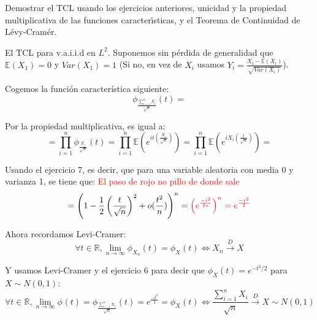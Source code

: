 \begin{problem}[8] Demostrar el TCL usando los ejercicios anteriores, unicidad y la propiedad multiplicativa de las funciones
caracter\'{\i}sticas, y el Teorema de Continuidad de L\'evy-Cram\'er.


\solution
El TCL para v.a.i.i.d en $L^2$. Suponemos sin pérdida de generalidad que $\mathbb{E}(X_1)=0$ y $Var(X_1)=1$ (Si no, en vez de $X_i$ usamos $Y_i =\frac{X_i -\mathbb{E}(X_i)}{\sqrt{Var(X_i)}}$).

Cogemos la función característica siguiente:
\[
\phi_{\frac{\sum_{i=1}^{n}X_i}{\sqrt{n}}}(t) =
\]

Por la propiedad multiplicativa, es igual a:
\[
=\prod_{i=1}^{n} \phi_{\frac{X_i}{\sqrt{n}}}(t)= \prod_{i=1}^{n} \mathbb{E}(e^{it(\frac{X_i}{\sqrt{n}})})=
\prod_{i=1}^{n} \mathbb{E}(e^{iX_i(\frac{t}{\sqrt{n}})})= 
\]

Usando el ejercicio 7, es decir, que para una variable aleatoria con media 0 y varianza 1, se tiene que: \textcolor{red}{El paso de rojo no pillo de donde sale}
\[
=\left(1-\frac{1}{2}\left(\frac{t}{\sqrt{n}}\right)^2+o(\frac{t^2}{n})\right)^n = \textcolor{red}{\left(e^{\frac{-t^2}{2n}}\right)^n=e^{\frac{-t^2}{2}}}
\]

Ahora recordamos Levi-Cramer:
\[
\forall t \in \mathbb{R}, \lim_{n \rightarrow \infty} \phi_{X_n}(t)=\phi_X(t) \Leftrightarrow X_n \stackrel{D}{\rightarrow} X
\]

Y usamos Levi-Cramer y el ejercicio 6 para decir que $\phi_X(t)=e^{-t^2/2}$ para $X\sim N(0,1)$:
\[
\forall t \in \mathbb{R}, \lim_{n \rightarrow \infty} \phi_{}(t)=\phi_{\frac{\sum_{i=1}^{n}X_i}{\sqrt{n}}}(t)=e^{\frac{-t^2}{2}} = \phi_X(t) \Leftrightarrow {\frac{\sum_{i=1}^{n}X_i}{\sqrt{n}}} \stackrel{D}{\rightarrow} X\sim N(0,1)
\]

\end{problem}


